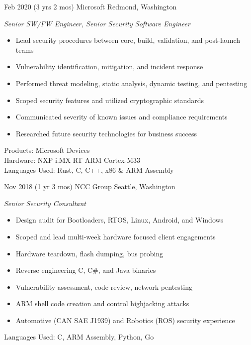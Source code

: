 \documentclass[print]{friggeri-cv} %
\begin{document}
\begin{entrylist}

\entry
{Feb 2020}
{(3 yrs 2 mos)}
{Microsoft}
{Redmond, Washington}
{\emph{Senior SW/FW Engineer, Senior Security Software Engineer}
\begin{itemize}
\item Lead security procedures between core, build, validation, and post-launch teams
\item Vulnerability identification, mitigation, and incident response
\item Performed threat modeling, static analysis, dynamic testing, and pentesting
\item Scoped security features and utilized cryptographic standards
\item Communicated severity of known issues and compliance requirements
\item Researched future security technologies for business success
\end{itemize}
Products: Microsoft Devices \\
Hardware: NXP i.MX RT ARM Cortex-M33 \\
Languages Used: Rust, C, C++, x86 \& ARM Assembly \\
}

\entry
{Nov 2018}
{(1 yr 3 mos)}
{NCC Group}
{Seattle, Washington}
{\emph{Senior Security Consultant}
\begin{itemize}
\item Design audit for Bootloaders, RTOS, Linux, Android, and Windows
\item Scoped and lead multi-week hardware focused client engagements
\item Hardware teardown, flash dumping, bus probing
\item Reverse engineering C, C\#, and Java binaries
\item Vulnerability assessment, code review, network pentesting
\item ARM shell code creation and control highjacking attacks
\item Automotive (CAN SAE J1939) and Robotics (ROS) security experience
\end{itemize}
Languages Used: C, ARM Assembly, Python, Go \\
}


\end{entrylist}
\end{document}
